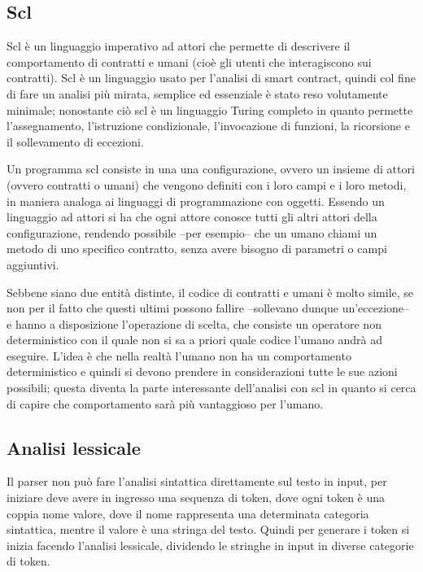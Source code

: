 \documentclass[]{article}
\begin{document}
\hypertarget{scl}{%
\subsection{Scl}\label{scl}}

Scl è un linguaggio imperativo ad attori che permette di descrivere il
comportamento di contratti e umani (cioè gli utenti che interagiscono
sui contratti). Scl è un linguaggio usato per l'analisi di smart
contract, quindi col fine di fare un analisi più mirata, semplice ed
essenziale è stato reso volutamente minimale; nonostante ciò scl è un
linguaggio Turing completo in quanto permette l'assegnamento,
l'istruzione condizionale, l'invocazione di funzioni, la ricorsione e il
sollevamento di eccezioni.

Un programma scl consiste in una una configurazione, ovvero un insieme
di attori (ovvero contratti o umani) che vengono definiti con i loro
campi e i loro metodi, in maniera analoga ai linguaggi di programmazione
con oggetti. Essendo un linguaggio ad attori si ha che ogni attore
conosce tutti gli altri attori della configurazione, rendendo possibile
--per esempio-- che un umano chiami un metodo di uno specifico
contratto, senza avere bisogno di parametri o campi aggiuntivi.

Sebbene siano due entità distinte, il codice di contratti e umani è
molto simile, se non per il fatto che questi ultimi possono fallire
--sollevano dunque un'eccezione-- e hanno a disposizione l'operazione di
scelta, che consiste un operatore non deterministico con il quale non si
sa a priori quale codice l'umano andrà ad eseguire. L'idea è che nella
realtà l'umano non ha un comportamento deterministico e quindi si devono
prendere in considerazioni tutte le sue azioni possibili; questa diventa
la parte interessante dell'analisi con scl in quanto si cerca di capire
che comportamento sarà più vantaggioso per l'umano.

\hypertarget{analisi-lessicale}{%
\subsection{Analisi lessicale}\label{analisi-lessicale}}

Il parser non può fare l'analisi sintattica direttamente sul testo in
input, per iniziare deve avere in ingresso una sequenza di token, dove
ogni token è una coppia nome valore, dove il nome rappresenta una
determinata categoria sintattica, mentre il valore è una stringa del
testo. Quindi per generare i token si inizia facendo l'analisi
lessicale, dividendo le stringhe in input in diverse categorie di token.
\end{document}
